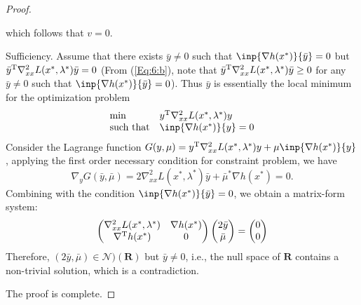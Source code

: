 \begin{enumerate}
\begin{proof}
\begin{itemize}
which follows that $v=0$.
\end{itemize}
Sufficiency. Assume that there exists $\bar y\ne0$ such that $\inp{\nabla h(x^*)}{\bar y}=0$ but $\bar{y}^{\mathrm T}\nabla^2_{xx}L(x^*,\lambda^*)\bar y=0$ (From (\ref{Eq:6:b}), note that $\bar{y}^{\mathrm T}\nabla^2_{xx}L(x^*,\lambda^*)\bar y\ge0$ for any $\bar y\ne0$ such that $\inp{\nabla h(x^*)}{\bar y}=0$). Thus $\bar y$ is essentially the local minimum for the optimization problem
\begin{equation}\label{Eq:10}
\begin{array}{ll}
\min&y\trans\nabla^2_{xx}L(x^*,\lambda^*)y\\
\mbox{such that}&\inp{\nabla h(x^*)}{y}=0
\end{array}
\end{equation}
Consider the Lagrange function $G(y,\mu)=y\trans\nabla^2_{xx}L(x^*,\lambda^*)y+\mu\inp{\nabla h(x^*)}{y}$, applying the first order necessary condition for constraint problem, we have
\[
\nabla_yG(\bar y,\bar \mu)
=
2\nabla^2_{xx}L(x^*,\lambda^*)\bar y+\bar\mu^*\nabla h(x^*)=0.
\]
Combining with the condition $\inp{\nabla h(x^*)}{\bar y}=0$, we obtain a matrix-form system:
\[
\begin{pmatrix}
\nabla_{xx}^2L(x^*,\lambda^*)&\nabla h(x^*)\\
\nabla^{\mathrm T} h(x^*)&0
\end{pmatrix}\begin{pmatrix}
2\bar y\\\bar\mu
\end{pmatrix}=\begin{pmatrix}
0\\0
\end{pmatrix}
\]
Therefore, $(2\bar y,\bar\mu)\in\mathcal{N})(\bm R)$ but $\bar y\ne0$, i.e., the null space of $\bm R$ contains a non-trivial solution, which is a contradiction.

The proof is complete.






\end{proof}


\end{enumerate}
